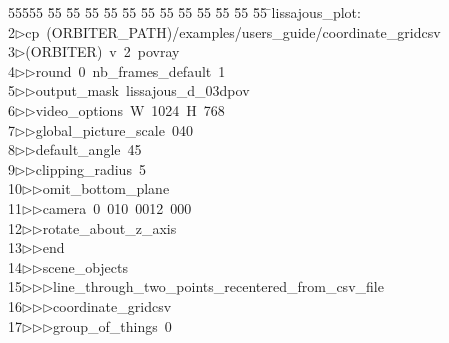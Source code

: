%
%
\begin{tabbing}
55555 \= 55 \= 55 \= 55 \= 55 \= 55 \= 55 \= 55 \= 55 \= 55 \= 55 \= 55 \= 55 \= \>lissajous\_plot:\\[0pt]
2\>$\triangleright$\>cp\ (ORBITER\_PATH)/examples/users\_guide/coordinate\_gridcsv\ \\[0pt]
3\>$\triangleright$\>(ORBITER)\ v\ 2\ povray\ \\[0pt]
4\>$\triangleright$\>$\triangleright$\>round\ 0\ nb\_frames\_default\ 1\ \\[0pt]
5\>$\triangleright$\>$\triangleright$\>output\_mask\ lissajous\_d\_03dpov\ \\[0pt]
6\>$\triangleright$\>$\triangleright$\>video\_options\ W\ 1024\ H\ 768\ \\[0pt]
7\>$\triangleright$\>$\triangleright$\>global\_picture\_scale\ 040\ \\[0pt]
8\>$\triangleright$\>$\triangleright$\>default\_angle\ 45\ \\[0pt]
9\>$\triangleright$\>$\triangleright$\>clipping\_radius\ 5\ \\[0pt]
10\>$\triangleright$\>$\triangleright$\>omit\_bottom\_plane\ \\[0pt]
11\>$\triangleright$\>$\triangleright$\>camera\ 0\ 010\ 0012\ 000\ \\[0pt]
12\>$\triangleright$\>$\triangleright$\>rotate\_about\_z\_axis\ \\[0pt]
13\>$\triangleright$\>$\triangleright$\>end\ \\[0pt]
14\>$\triangleright$\>$\triangleright$\>scene\_objects\ \\[0pt]
15\>$\triangleright$\>$\triangleright$\>$\triangleright$\>line\_through\_two\_points\_recentered\_from\_csv\_file\ \\[0pt]
16\>$\triangleright$\>$\triangleright$\>$\triangleright$\>coordinate\_gridcsv\ \\[0pt]
17\>$\triangleright$\>$\triangleright$\>$\triangleright$\>group\_of\_things\ 0\ \\[0pt]

\end{tabbing}
